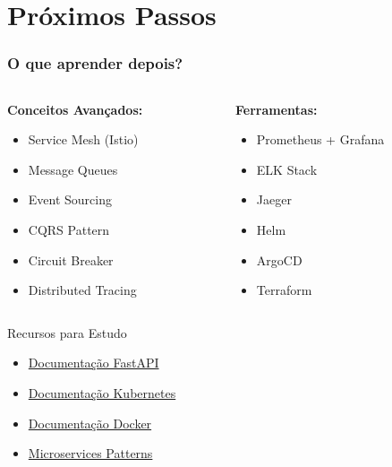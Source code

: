 \documentclass[aspectratio=169]{beamer}
\begin{document}
\section{Próximos Passos}

\begin{frame}
    \frametitle{O que aprender depois?}
    \begin{columns}
        \begin{column}{0.5\textwidth}
            \textbf{Conceitos Avançados:}
            \begin{itemize}
                \item Service Mesh (Istio)
                \item Message Queues
                \item Event Sourcing
                \item CQRS Pattern
                \item Circuit Breaker
                \item Distributed Tracing
            \end{itemize}
        \end{column}
        \begin{column}{0.5\textwidth}
            \textbf{Ferramentas:}
            \begin{itemize}
                \item Prometheus + Grafana
                \item ELK Stack
                \item Jaeger
                \item Helm
                \item ArgoCD
                \item Terraform
            \end{itemize}
        \end{column}
    \end{columns}
    
    \vspace{1em}
    \begin{alertblock}{Recursos para Estudo}
        \begin{itemize}
            \item \href{https://fastapi.tiangolo.com/}{Documentação FastAPI}
            \item \href{https://kubernetes.io/docs/}{Documentação Kubernetes}
            \item \href{https://docs.docker.com/}{Documentação Docker}
            \item \href{https://microservices.io/}{Microservices Patterns}
        \end{itemize}
    \end{alertblock}
\end{frame}
\end{document}
